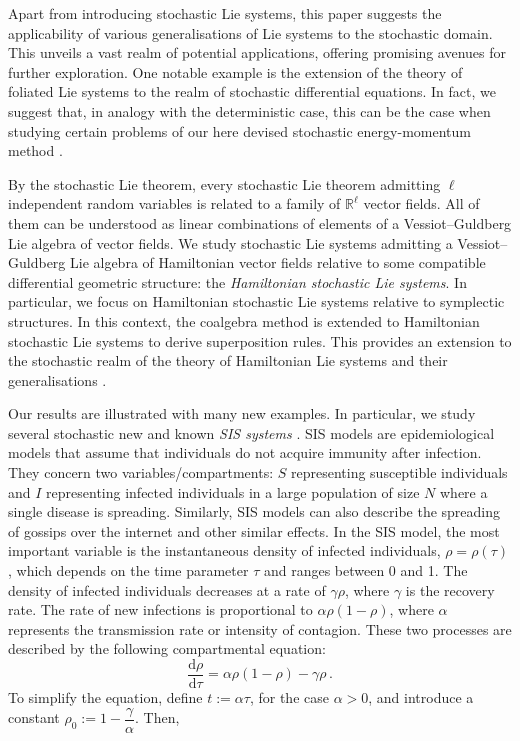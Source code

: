 \documentclass[11pt]{article}
\theoremstyle{plain}
\theoremstyle{definition}
\renewcommand{\d}{\mathrm{d}}
\def\d{\mathrm{d}}
\begin{document}
Apart from introducing stochastic Lie systems, this paper suggests the applicability of various generalisations of Lie systems \cite{Dissertationes} to the stochastic domain. This unveils a vast realm of potential applications, offering promising avenues for further exploration. One notable example is the extension of the theory of foliated Lie systems \cite{CLW22} to the realm of stochastic differential equations. In fact, we suggest that, in analogy with the deterministic case, this can be the case when  studying certain problems of our here devised stochastic energy-momentum method \cite{LZ21}. 

By the stochastic Lie theorem, every stochastic Lie theorem admitting $\ell$ independent random variables is related to a family of $\mathbb{R}^\ell$ vector fields. All of them can be understood as linear combinations of elements of a Vessiot--Guldberg Lie algebra of vector fields. We study stochastic Lie systems admitting a Vessiot--Guldberg Lie algebra of Hamiltonian vector fields relative to some compatible differential geometric structure: the {\it Hamiltonian stochastic Lie systems}. In particular, we focus on Hamiltonian stochastic Lie systems relative to symplectic structures. In this context, the coalgebra method is extended to Hamiltonian stochastic Lie systems to derive superposition rules. This provides an extension to the stochastic realm of the theory of Hamiltonian Lie systems and their generalisations \cite{LS21}. 

Our results are illustrated with many new examples. In particular, we study several stochastic new and known {\it SIS systems} \cite{CCM19,CCM21,EFSZ22,NM19,Ot21,WCDG18}. SIS models are epidemiological models that assume that individuals do not acquire immunity after infection. They concern two variables/compartments: $S$ representing susceptible individuals and $I$ representing infected individuals in a large population of size $N$ where a single disease is spreading. Similarly, SIS models can also describe the spreading of gossips over the internet and other similar effects.  In the SIS model, the most important variable is the instantaneous density of infected individuals,  $\rho = \rho(\tau)$, which depends on the time parameter $\tau$ and ranges between 0 and 1.
The density of infected individuals decreases at a rate of $\gamma\rho$, where $\gamma$ is the recovery rate. The rate of new infections is proportional to $\alpha\rho(1-\rho)$, where $\alpha$ represents the transmission rate or intensity of contagion. These two processes are described by the following compartmental equation:
\[
\frac{\d\rho}{\d\tau} = \alpha\rho(1-\rho) - \gamma\rho\,.
\]
To simplify the equation, define  $t := \alpha\tau$, for the case $\alpha>0$, and introduce a constant $\rho_0 := 1 - \dfrac{\gamma}{\alpha}$. Then,
\end{document}
